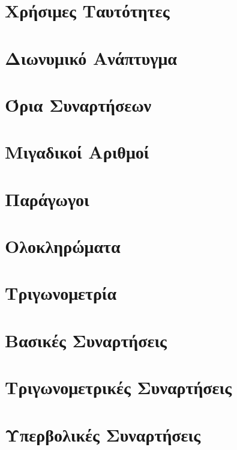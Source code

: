 \documentclass[11pt]{report}
\begin{document}
\chapter{Χρήσιμες Ταυτότητες}


\vspace{\baselineskip}

\chapter{Διωνυμικό Ανάπτυγμα}


\vspace{\baselineskip}

\chapter{Όρια Συναρτήσεων}


\newpage

\chapter{Μιγαδικοί Αριθμοί}


\newpage

\chapter{Παράγωγοι}


\newpage

\chapter{Ολοκληρώματα}


\newpage

\chapter{Τριγωνομετρία}


\newpage

\chapter{Βασικές Συναρτήσεις}


\newpage

\chapter{Τριγωνομετρικές Συναρτήσεις}


\newpage

\chapter{Υπερβολικές Συναρτήσεις}

\end{document}
